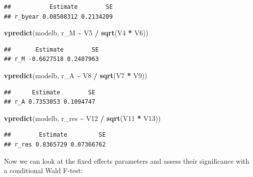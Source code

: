 \documentclass[
  12pt,
]{book}
\newenvironment{Shaded}{\begin{snugshade}}{\end{snugshade}}
\newcommand{\DataTypeTok}[1]{\textcolor[rgb]{0.13,0.29,0.53}{#1}}
\newcommand{\KeywordTok}[1]{\textcolor[rgb]{0.13,0.29,0.53}{\textbf{#1}}}
\newcommand{\NormalTok}[1]{#1}
\newcommand{\OperatorTok}[1]{\textcolor[rgb]{0.81,0.36,0.00}{\textbf{#1}}}
\newcommand{\OtherTok}[1]{\textcolor[rgb]{0.56,0.35,0.01}{#1}}
\newcommand{\StringTok}[1]{\textcolor[rgb]{0.31,0.60,0.02}{#1}}
\begin{document}
\begin{verbatim}
##           Estimate        SE
## r_byear 0.08508312 0.2134209
\end{verbatim}

\begin{Shaded}
\begin{Highlighting}[]
\KeywordTok{vpredict}\NormalTok{(modelb, r\_M }\OperatorTok{\textasciitilde{}}\StringTok{ }\NormalTok{V5 }\OperatorTok{/}\StringTok{ }\KeywordTok{sqrt}\NormalTok{(V4 }\OperatorTok{*}\StringTok{ }\NormalTok{V6))}
\end{Highlighting}
\end{Shaded}

\begin{verbatim}
##       Estimate        SE
## r_M -0.6627518 0.2487963
\end{verbatim}

\begin{Shaded}
\begin{Highlighting}[]
\KeywordTok{vpredict}\NormalTok{(modelb, r\_A }\OperatorTok{\textasciitilde{}}\StringTok{ }\NormalTok{V8 }\OperatorTok{/}\StringTok{ }\KeywordTok{sqrt}\NormalTok{(V7 }\OperatorTok{*}\StringTok{ }\NormalTok{V9))}
\end{Highlighting}
\end{Shaded}

\begin{verbatim}
##      Estimate        SE
## r_A 0.7353053 0.1094747
\end{verbatim}

\begin{Shaded}
\begin{Highlighting}[]
\KeywordTok{vpredict}\NormalTok{(modelb, r\_res }\OperatorTok{\textasciitilde{}}\StringTok{ }\NormalTok{V12 }\OperatorTok{/}\StringTok{ }\KeywordTok{sqrt}\NormalTok{(V11 }\OperatorTok{*}\StringTok{ }\NormalTok{V13))}
\end{Highlighting}
\end{Shaded}

\begin{verbatim}
##        Estimate         SE
## r_res 0.8365729 0.07366762
\end{verbatim}

Now we can look at the fixed effects parameters and assess their significance with a conditional Wald F-test:

\begin{Shaded}
\end{Shaded}
\end{document}
